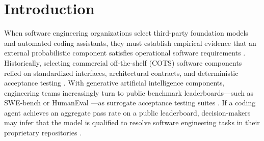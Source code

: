 \documentclass[runningheads]{llncs}
\begin{document}
\begin{abstract}
\textbf{Contribution:} Completed contributions comprise: (1)~a requirements-to-benchmark traceability method with explicit assumption tracking; (2)~an executable decision engine implementing three comparative methods over supplied review judgments; (3)~exact binomial power analyses and a 576-cell parametric simulation benchmarking review-based abstention against random and uncertainty-proximity controls; and (4)~a 12-attempt fixture pilot verifying harness execution mechanics. A prospective evaluation protocol specifies 696 planned attempts across two configurations, three repositories, and 90 target tasks.

\end{abstract}

\section{Introduction}
\label{sec:intro}

When software engineering organizations select third-party foundation models and automated coding assistants, they must establish empirical evidence that an external probabilistic component satisfies operational software requirements \cite{cleland_huang_traceability_2012,habiba_re4ai_maturity_2024,lewis_quality_model_ml_2026}. Historically, selecting commercial off-the-shelf (COTS) software components relied on standardized interfaces, architectural contracts, and deterministic acceptance testing \cite{sljivo_assurance_contracts_2014}. With generative artificial intelligence components, engineering teams increasingly turn to public benchmark leaderboards---such as SWE-bench \cite{jimenez_swebench_2024} or HumanEval \cite{human_eval_repository}---as surrogate acceptance testing suites \cite{ghosh_evaluation_cards_2026,hou_llm4se_survey_2024,singh_leaderboard_illusion}. If a coding agent achieves an aggregate pass rate on a public leaderboard, decision-makers may infer that the model is qualified to resolve software engineering tasks in their proprietary repositories \cite{bean_measuring_what_matters,reuel_betterbench}.
\end{document}
